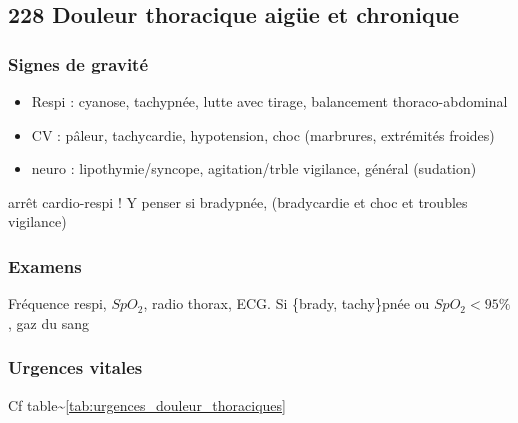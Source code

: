 \documentclass[11pt]{article}
\begin{document}
\subsection{228 \textdagger{} Douleur thoracique aigüe et chronique}
\label{sec:orgcab00d8}
\label{sec:228_douleur_thoracique_aigue_et_chronique}

\subsubsection{Signes de gravité}
\label{sec:org34f91b9}

\begin{itemize}
\item Respi : cyanose, tachypnée, lutte avec tirage, balancement thoraco-abdominal
\item CV : pâleur, tachycardie, hypotension, choc (marbrures, extrémités
froides)
\item neuro : lipothymie/syncope, agitation/trble vigilance, général (sudation)
\end{itemize}


\danger arrêt cardio-respi ! Y penser si bradypnée, (bradycardie et choc et troubles vigilance)

\subsubsection{Examens}
\label{sec:org551338b}
Fréquence respi, \(SpO_2\), radio thorax, ECG.
Si \{brady, tachy\}pnée ou \(SpO_2 < 95\%\), gaz du sang

\subsubsection{Urgences vitales}
\label{sec:orgf3bea0b}
Cf table\textasciitilde{}\ref{tab:urgences_douleur_thoraciques}
\end{document}
